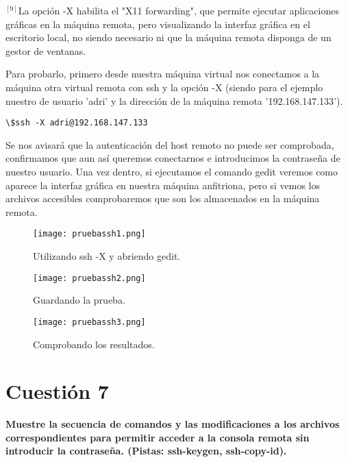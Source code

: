 \documentclass[a4paper, 11pt]{article} %
\begin{document}
$^{[9]}$La opción -X habilita el "X11 forwarding", que permite ejecutar aplicaciones gráficas en la máquina remota, pero visualizando la interfaz gráfica en el escritorio local, no siendo necesario ni que la máquina remota disponga de un gestor de ventanas.

Para probarlo, primero desde nuestra máquina virtual nos conectamos a la máquina otra virtual remota con ssh y la opción -X (siendo para el ejemplo nuestro de usuario 'adri' y la dirección de la máquina remota '192.168.147.133').

\begin{verbatim}
\$ssh -X adri@192.168.147.133
\end{verbatim}
 
Se nos avisará que la autenticación del host remoto no puede ser comprobada, confirmamos que aun así queremos conectarnos e introducimos la contraseña de nuestro usuario. Una vez dentro, si ejecutamos el comando gedit veremos como aparece la interfaz gráfica en nuestra máquina anfitriona, pero si vemos los archivos accesibles comprobaremos que son los almacenados en la máquina remota.

\begin{figure}[h]
\centering 
\texttt{[image: pruebassh1.png]} 
\caption{Utilizando ssh -X y abriendo gedit.} 
\vspace{-0.5cm}
\label{contexto:figura} 
\end{figure}

\pagebreak


\begin{figure}[h]
\centering 
\texttt{[image: pruebassh2.png]} 
\caption{Guardando la prueba.} 
\vspace{-0.5cm}
\label{contexto:figura} 
\end{figure}

\begin{figure}[h]
\centering 
\texttt{[image: pruebassh3.png]} 
\caption{Comprobando los resultados.} 
\vspace{-0.5cm}
\label{contexto:figura} 
\end{figure}

\pagebreak



\section{Cuestión 7}
\textbf{Muestre la secuencia de comandos y las modificaciones a los archivos correspondientes para permitir acceder a la consola remota sin introducir la contraseña. (Pistas: ssh-keygen, ssh-copy-id).}\\
\end{document}
